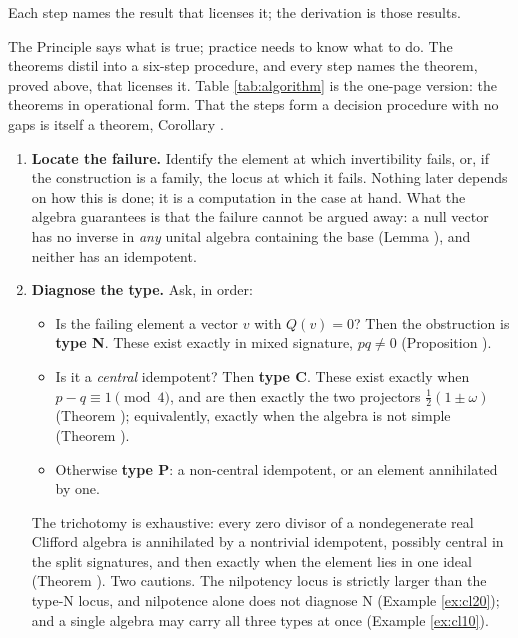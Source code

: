Each step names the result that licenses it; the derivation is those results.

The Principle says what is true; practice needs to know what to do. The theorems distil into a six-step procedure, and every step names the theorem, proved above, that licenses it. Table \ref{tab:algorithm} is the one-page version: the theorems in operational form. That the steps form a decision procedure with no gaps is itself a theorem, Corollary .




\begin{enumerate}
\item[\textbf{Step 1.}] \textbf{Locate the failure.} Identify the element at which invertibility fails, or, if the construction is a family, the locus at which it fails. Nothing later depends on how this is done; it is a computation in the case at hand. What the algebra guarantees is that the failure cannot be argued away: a null vector has no inverse in \emph{any} unital algebra containing the base (Lemma ), and neither has an idempotent.

\item[\textbf{Step 2.}] \textbf{Diagnose the type.} Ask, in order:
  \begin{itemize}
  \item Is the failing element a vector $v$ with $Q(v) = 0$? Then the obstruction is \textbf{type N}. These exist exactly in mixed signature, $pq \neq 0$ (Proposition ).
  \item Is it a \emph{central} idempotent? Then \textbf{type C}. These exist exactly when $p - q \equiv 1 \pmod 4$, and are then exactly the two projectors $\tfrac12(1 \pm \omega)$ (Theorem ); equivalently, exactly when the algebra is not simple (Theorem ).
  \item Otherwise \textbf{type P}: a non-central idempotent, or an element annihilated by one.
  \end{itemize}
  The trichotomy is exhaustive: every zero divisor of a nondegenerate real Clifford algebra is annihilated by a nontrivial idempotent, possibly central in the split signatures, and then exactly when the element lies in one ideal (Theorem ). Two cautions. The nilpotency locus is strictly larger than the type-N locus, and nilpotence alone does not diagnose N (Example \ref{ex:cl20}); and a single algebra may carry all three types at once (Example \ref{ex:cl10}).


\end{enumerate}
